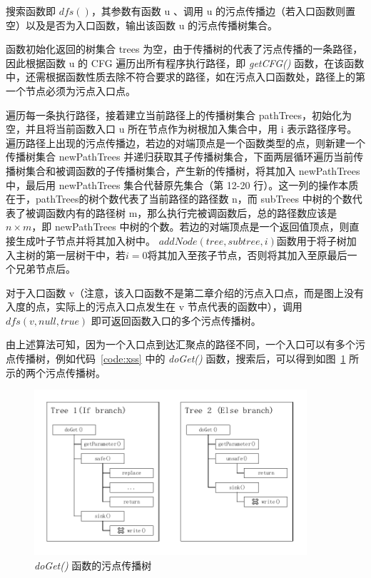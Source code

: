 搜索函数即 $dfs()$，其参数有函数 u 、调用 u 的污点传播边（若入口函数则置空）以及是否为入口函数，输出该函数 u 的污点传播树集合。

函数初始化返回的树集合 trees 为空，由于传播树的代表了污点传播的一条路径，因此根据函数 u 的 CFG 遍历出所有程序执行路径，即 \textit{getCFG()} 函数，在该函数中，还需根据函数性质去除不符合要求的路径，如在污点入口函数处，路径上的第一个节点必须为污点入口点。

遍历每一条执行路径，接着建立当前路径上的传播树集合 pathTrees，初始化为空，并且将当前函数入口 u 所在节点作为树根加入集合中，用 i 表示路径序号。遍历路径上出现的污点传播边，若边的对端顶点是一个函数类型的点，则新建一个传播树集合 newPathTrees 并递归获取其子传播树集合，下面两层循环遍历当前传播树集合和被调函数的子传播树集合，产生新的传播树，将其加入 newPathTrees 中，最后用 newPathTrees 集合代替原先集合（第 12-20 行）。这一列的操作本质在于，pathTrees的树个数代表了当前路径的路径数 n，而 subTrees 中树的个数代表了被调函数内有的路径树 m，那么执行完被调函数后，总的路径数应该是 $n \times m$，即 newPathTrees 中树的个数。若边的对端顶点是一个返回值顶点，则直接生成叶子节点并将其加入树中。
$addNode(tree, subtree, i)$函数用于将子树加入主树的第一层树干中，若$i=0$将其加入至孩子节点，否则将其加入至原最后一个兄弟节点后。

对于入口函数 v（注意，该入口函数不是第二章介绍的污点入口点，而是图上没有入度的点，实际上的污点入口点发生在 v 节点代表的函数中），调用$dfs(v, null,true)$ 即可返回函数入口的多个污点传播树。

由上述算法可知，因为一个入口点到达汇聚点的路径不同，一个入口可以有多个污点传播树，例如代码~\ref{code:xss} 中的 \textit{doGet()} 函数，搜索后，可以得到如图~\ref{taintTree} 所示的两个污点传播树。

\begin{figure}[!htb]
    \centering
    \includegraphics[width=0.9\textwidth]{FIGs/chapter4/taintTree.pdf}
    \caption{\textit{doGet()} 函数的污点传播树}\label{taintTree}
\end{figure}

